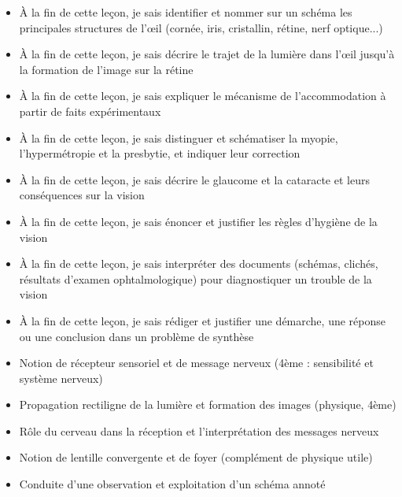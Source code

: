 \documentclass[11pt]{article}
\begin{document}
\begin{objectifs}
\begin{itemize}
\item À la fin de cette leçon, je sais identifier et nommer sur un schéma les principales structures de l'œil (cornée, iris, cristallin, rétine, nerf optique...)
\item À la fin de cette leçon, je sais décrire le trajet de la lumière dans l'œil jusqu'à la formation de l'image sur la rétine
\item À la fin de cette leçon, je sais expliquer le mécanisme de l'accommodation à partir de faits expérimentaux
\item À la fin de cette leçon, je sais distinguer et schématiser la myopie, l'hypermétropie et la presbytie, et indiquer leur correction
\item À la fin de cette leçon, je sais décrire le glaucome et la cataracte et leurs conséquences sur la vision
\item À la fin de cette leçon, je sais énoncer et justifier les règles d'hygiène de la vision
\item À la fin de cette leçon, je sais interpréter des documents (schémas, clichés, résultats d'examen ophtalmologique) pour diagnostiquer un trouble de la vision
\item À la fin de cette leçon, je sais rédiger et justifier une démarche, une réponse ou une conclusion dans un problème de synthèse
\end{itemize}
\end{objectifs}

\begin{prerequis}
\begin{itemize}
\item Notion de récepteur sensoriel et de message nerveux (4ème : sensibilité et système nerveux)
\item Propagation rectiligne de la lumière et formation des images (physique, 4ème)
\item Rôle du cerveau dans la réception et l'interprétation des messages nerveux
\item Notion de lentille convergente et de foyer (complément de physique utile)
\item Conduite d'une observation et exploitation d'un schéma annoté
\end{itemize}
\end{prerequis}

\newpage

\end{document}
